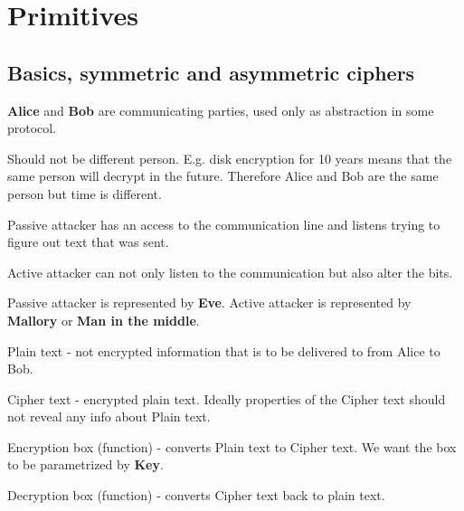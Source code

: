 \section{\texorpdfstring{Primitives}{Primitives}}
\vspace{5mm}
\large

\subsection{Basics, symmetric and asymmetric ciphers}

\begin{agreement}
	\textbf{Alice} and \textbf{Bob} are communicating parties, used only as abstraction in some protocol.

	Should not be different person. E.g. disk encryption for 10 years means that the same person will decrypt in the future. Therefore Alice and Bob are the same person but time is different.
\end{agreement}

\begin{definition}
	Passive attacker has an access to the communication line and listens trying to figure out text that was sent.
\end{definition}
\begin{definition}
	Active attacker can not only listen to the communication but also alter the bits.
\end{definition}

\begin{agreement}
	Passive attacker is represented by \textbf{Eve}. Active attacker is represented by \textbf{Mallory} or \textbf{Man in the middle}.
\end{agreement}

\begin{definition}
	Plain text - not encrypted information that is to be delivered to from Alice to Bob.
\end{definition}
\begin{definition}
	Cipher text - encrypted plain text. Ideally properties of the Cipher text should not reveal any info about Plain text.
\end{definition}

\begin{definition}
	Encryption box (function) - converts Plain text to Cipher text. We want the box to be parametrized by \textbf{Key}.

	Decryption box (function) - converts Cipher text back to plain text.
\end{definition}

